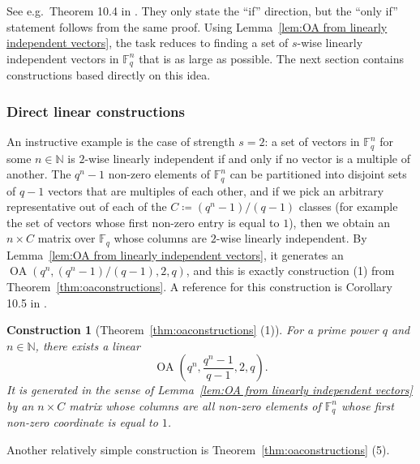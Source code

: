 \documentclass[11pt, letterpaper]{article}
\newtheorem{construction}{Construction}
\theoremstyle{definition}
\theoremstyle{remark}
\DeclareMathOperator{\OA}{OA}
\newcommand{\N}{\mathbb{N}}
\begin{document}
\begin{appendices}
See e.g.\ Theorem 10.4 in \cite{stinson2008}. They only state the ``if'' direction, but the ``only if'' statement follows from the same proof. Using Lemma~\ref{lem:OA from linearly independent vectors}, the task reduces to finding a set of $s$-wise linearly independent vectors in $\mathbb{F}_q^n$ that is as large as possible. The next section contains constructions based directly on this idea.

\subsubsection{Direct linear constructions}
An instructive example is the case of strength $s=2$: a set of vectors in $\mathbb{F}_q^n$ for some $n\in \N$ is $2$-wise linearly independent if and only if no vector is a multiple of another. The $q^n-1$ non-zero elements of $\mathbb{F}_q^n$ can be partitioned into disjoint sets of $q-1$ vectors that are multiples of each other, and if we pick an arbitrary representative out of each of the $C \coloneqq (q^n-1)/(q-1)$ classes (for example the set of vectors whose first non-zero entry is equal to $1$), then we obtain an $n \times C$ matrix over $\mathbb{F}_q$ whose columns are $2$-wise linearly independent. By Lemma~\ref{lem:OA from linearly independent vectors}, it generates an $\OA(q^n,(q^n-1)/(q-1),2,q)$, and this is exactly construction (1) from Theorem~\ref{thm:oaconstructions}. A reference for this construction is Corollary 10.5 in \cite{stinson2008}.

\begin{construction}[Theorem~\ref{thm:oaconstructions} (1)]
    For a prime power $q$ and $n\in \N$, there exists a linear \[
    \OA \left( q^n, \frac{q^n-1}{q-1},2,q\right).
    \] It is generated in the sense of Lemma~\ref{lem:OA from linearly independent vectors} by an $n \times C$ matrix whose columns are all non-zero elements of $\mathbb{F}_q^n$ whose first non-zero coordinate is equal to $1$.
\end{construction}

Another relatively simple construction is Tneorem~\ref{thm:oaconstructions} (5).


\end{appendices}
\end{document}
